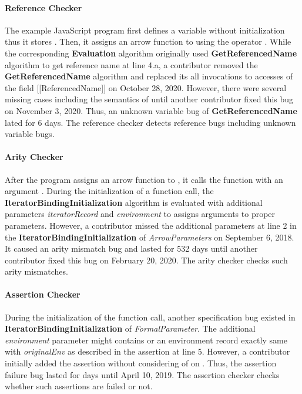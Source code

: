 \paragraph{Reference Checker} The example JavaScript program first defines a
variable  without initialization thus it stores .
Then, it assigns an arrow function to  using the operator
.  While the corresponding \textbf{Evaluation} algorithm originally
used \textbf{GetReferencedName} algorithm to get reference name at line 4.a, a
contributor removed the \textbf{GetReferencedName} algorithm and replaced its
all invocations to accesses of the field [[ReferencedName]] on October 28, 2020.
However, there were several missing cases including the semantics of
 until another contributor fixed this bug on November 3, 2020.
Thus, an unknown variable bug of \textbf{GetReferencedName} lated for 6 days.
The reference checker detects reference bugs including unknown variable bugs.

\paragraph{Arity Checker} After the program assigns an arrow function to
, it calls the function with an argument .  During the
initialization of a function call, the \textbf{IteratorBindingInitialization}
algorithm is evaluated with additional parameters \textit{iteratorRecord} and
\textit{environment} to assigns arguments to proper parameters.  However, a
contributor missed the additional parameters at line 2 in the
\textbf{IteratorBindingInitialization} of \textit{ArrowParameters} on September
6, 2018.  It caused an arity mismatch bug and lasted for 532 days until another
contributor fixed this bug on February 20, 2020.  The arity checker checks such
arity mismatches.

\paragraph{Assertion Checker} During the initialization of the function call,
another specification bug existed in \textbf{IteratorBindingInitialization} of
\textit{FormalParameter}.  The additional \textit{environment} parameter might
contains  or an environment record exactly same with
\textit{originalEnv} as described in the assertion at line 5.  However, a
contributor initially added the assertion without considering of
 on .  Thus, the assertion failure bug
lasted for  days until April 10, 2019.  The assertion checker checks
whether such assertions are failed or not.

